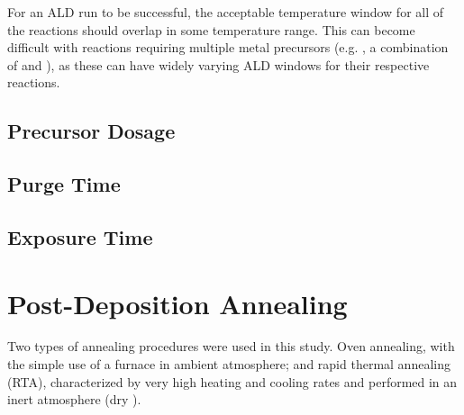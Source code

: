 For an ALD run to be successful, the acceptable temperature window for all of the reactions should overlap in some temperature range. This can become difficult with reactions requiring multiple metal precursors (e.g. \PTO, a combination of  and ), as these can have widely varying ALD windows for their respective reactions. 


\subsection{Precursor Dosage}

\lipsum


\subsection{Purge Time}

\lipsum


\subsection{Exposure Time}

\lipsum


\section{Post-Deposition Annealing}

Two types of annealing procedures were used in this study. Oven annealing, with the simple use of a furnace in ambient atmosphere; and rapid thermal annealing (RTA), characterized by very high heating and cooling rates and performed in an inert atmosphere (dry ). 








